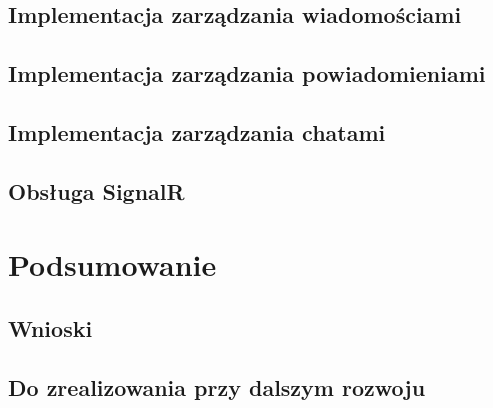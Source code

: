 \documentclass[12pt,a4paper]{article}
\begin{document}
\subsection{Implementacja zarządzania wiadomościami}
\subsection{Implementacja zarządzania powiadomieniami}
\subsection{Implementacja zarządzania chatami}
\subsection{Obsługa SignalR}

\section{Podsumowanie}

\subsection{Wnioski}
\subsection{Do zrealizowania przy dalszym rozwoju}
\end{document}
